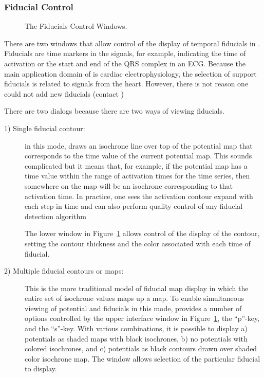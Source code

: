 \subsubsection{Fiducial Control}
\label{sec:fiducialswindow}

\begin{figure}[htb]
  \begin{makeimage}
  \end{makeimage}
  \fiducialswindow
  \caption{\label{fig:fid1} The Fiducials Control Windows.}
\end{figure}

There are two windows that allow control of the display of temporal
fiducials in \map{}.  Fiducials are time markers in the signals, for
example, indicating the time of activation or the start and end of the QRS
complex in an ECG.  Because the main application domain of \map{} is
cardiac electrophysiology, the selection of support fiducials is related to
signals from the heart.  However, there is not reason one could not add new
fiducials (contact \rob{}) 

There are two dialogs because there are two ways of viewing fiducials.
%
\begin{description}
  \item [1) Single fiducial contour: ] in this mode, \map{} draws an
    isochrone line over top of the potential map that corresponds to the
    time value of the current potential map.  This sounds complicated but
    it means that, for example, if the potential map has a time value
    within the range of activation times for the time series, then
    somewhere on the map will be an isochrone corresponding to that
    activation time.  In practice, one sees the activation contour 
    expand with each step in time and can also perform quality control of
    any fiducial detection algorithm
    
    The lower window in Figure~\ref{fig:fid1} allows control of the display
    of the contour, setting the contour thickness and the color associated
    with each time of fiducial.
    
  \item [2) Multiple fiducial contours or maps:] This is the more
    traditional model of fiducial map display in which the entire set of
    isochrone values maps up a map.  To enable simultaneous viewing of
    potential and fiducials in this mode, \map{} provides a number of
    options controlled by the upper interface window in
    Figure~\ref{fig:fid1}, the ``p''-key, and the ``s''-key.  With various
    combinations, it is possible to display a) potentials as shaded maps
    with black isochrones, b) no potentials with colored isochrones, and c)
    potentials as black contours drawn over shaded color isochrone map.
    The window allows selection of the particular fiducial to display.
\end{description}

